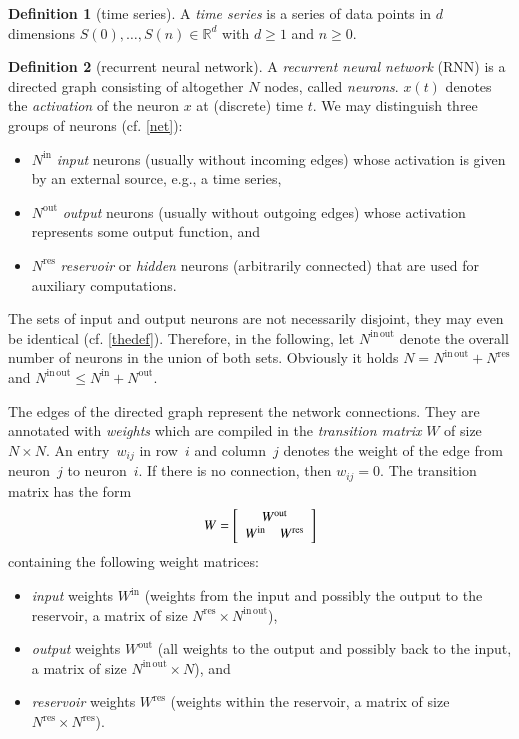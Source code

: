 \documentclass[preprint,12pt,times,authoryear]{elsarticle}%
\theoremstyle{definition}
\newtheorem{defn}{Definition}
\begin{document}
\begin{defn}[time series]
A \emph{time series} is a series of data points in $d$ dimensions
$S(0),\dots,S(n) \in \mathbb{R}^d$ with $d \ge 1$ and $n \ge 0$.
\end{defn}

\begin{defn}[recurrent neural network]
A \emph{recurrent neural network} (RNN) is a directed graph consisting of
altogether $N$ nodes, called \emph{neurons}. $x(t)$ denotes the
\emph{activation} of the neuron $x$ at (discrete) time $t$. We may distinguish
three groups of neurons (cf. \cref{net}):
\begin{itemize}
  \item $N^\mathrm{in}$ \emph{input} neurons (usually without incoming edges)
	whose activation is given by an external source, e.g., a time series,
  \item $N^\mathrm{out}$ \emph{output} neurons (usually without outgoing edges)
	whose activation represents some output function, and
  \item $N^\mathrm{res}$ \emph{reservoir} or \emph{hidden} neurons (arbitrarily
	connected) that are used for auxiliary computations.
\end{itemize}
The sets of input and output neurons are not necessarily disjoint, they may even
be identical (cf. \cref{thedef}). Therefore, in the following, let
$N^\mathrm{in\,out}$ denote the overall number of neurons in the union of both
sets. Obviously it holds $N = N^\mathrm{in\,out}+N^\mathrm{res}$ and
$N^\mathrm{in\,out} \le N^\mathrm{in}+N^\mathrm{out}$.

The edges of the directed graph represent the network connections. They are
annotated with \emph{weights} which are compiled in the \emph{transition matrix}
$W$ of size $N \times N$. An entry~$w_{ij}$ in row~$i$ and column~$j$ denotes the weight of the edge
from neuron~$j$ to neuron~$i$. If there is no connection, then
$w_{ij} = 0$. The transition matrix has the form
\begin{equation}\label{matrix}
  W = \left[ \begin{array}{cc}
  \multicolumn{2}{c}{W^\mathrm{out}}\\
  W^\mathrm{in} & W^\mathrm{res}
\end{array} \right]
\end{equation}
containing the following weight matrices:
\begin{itemize}
  \item \emph{input} weights $W^\mathrm{in}$ (weights from the input and
	possibly the output to the reservoir, a matrix of size $N^\mathrm{res} \times N^\mathrm{in\,out}$),
  \item \emph{output} weights $W^\mathrm{out}$ (all weights to the output and
	possibly back to the input, a matrix of size $N^\mathrm{in\,out} \times N$), and
  \item \emph{reservoir} weights $W^\mathrm{res}$ (weights within the reservoir,
	a matrix of size $N^\mathrm{res} \times N^\mathrm{res}$).
\end{itemize}
\end{defn}
\end{document}
